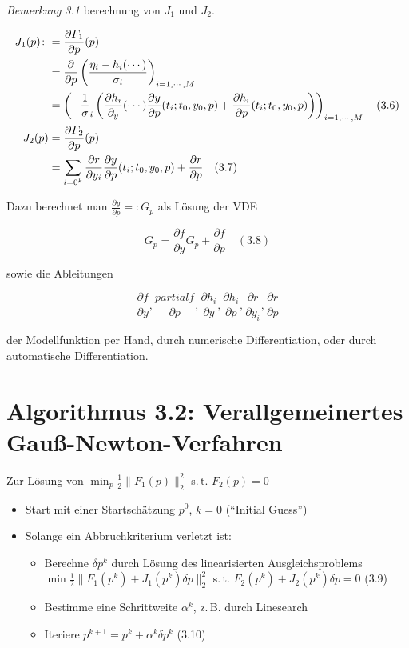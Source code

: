 \emph{Bemerkung 3.1} berechnung von $J_1$ und $J_2$.

\begin{align*}
J_1(p) \colon&= \frac{\partial F_1}{\partial p} (p) \\
&= \frac{\partial}{\partial p} \left( \frac{\eta_i - h_i(\cdots)}{\sigma_i} \right)_{i=1,\cdots,M} \\
&= \left( -\frac 1 \sigma_i \left( \frac{\partial h_i}{\partial_y} (\cdots) \frac{\partial y}{\partial p}(t_i; t_0, y_0, p) + \frac{\partial h_i}{\partial p} (t_i; t_0, y_0, p) \right) \right)_{i=1,\cdots,M} \quad (3.6)\\
J_2(p) &= \frac{\partial F_2}{\partial p} (p) \\
&= \sum_{i=0^k} \frac{\partial r}{\partial y_i} \frac{\partial y}{\partial p} (t_i; t_0, y_0, p) + \frac{\partial r}{\partial p} \quad (3.7)
\end{align*}

Dazu berechnet man $\tfrac{\partial y}{\partial p} =\colon G_p$ als Lösung der VDE

\[ \dot G_p = \frac{\partial f}{\partial y} G_p + \frac{\partial f}{\partial p} \quad (3.8)\]

sowie die Ableitungen

\[ \frac{\partial f}{\partial y}, \frac{partial f}{\partial p}, \frac{\partial h_i}{\partial y}, \frac{\partial h_i}{\partial p}, \frac{\partial r}{\partial y_i}, \frac{\partial r}{\partial p}\]

der Modellfunktion per Hand, durch numerische Differentiation, oder durch automatische Differentiation.

\section*{Algorithmus 3.2: Verallgemeinertes Gauß-Newton-Verfahren}

Zur Lösung von $\min_p \tfrac 12 \|F_1(p)\|_2^2$ s.\,t. $F_2(p) = 0$

\begin{itemize}
\item Start mit einer Startschätzung $p^0$, $k=0$ ("`Initial Guess"')
\item Solange ein Abbruchkriterium verletzt ist:
\begin{itemize}
\item Berechne $\delta p^k$ durch Lösung des linearisierten Ausgleichsproblems $\min \tfrac 12 \|F_1(p^k) + J_1(p^k) \delta p\|_2^2$ s.\,t. $F_2(p^k) + J_2(p^k) \delta p = 0$ (3.9)
\item Bestimme eine Schrittweite $\alpha^k$, z.\,B. durch Linesearch 
\item Iteriere $p^{k+1} = p^k + \alpha^k \delta p^k$ (3.10)
\end{itemize} 
\end{itemize}

